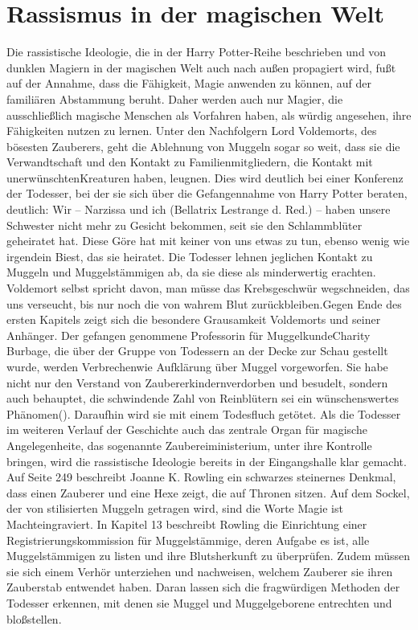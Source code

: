\section{Rassismus in der magischen Welt}
Die rassistische Ideologie, die in der \glqq Harry Potter\grqq-Reihe beschrieben und von dunklen Magiern in der magischen Welt auch nach außen propagiert wird, fußt auf der Annahme, dass die Fähigkeit, Magie anwenden zu können, auf der familiären Abstammung beruht. Daher werden auch nur Magier, die ausschließlich magische Menschen als Vorfahren haben, als würdig angesehen, ihre Fähigkeiten nutzen zu lernen. Unter den Nachfolgern Lord Voldemorts, des bösesten Zauberers, geht die Ablehnung von Muggeln sogar so weit, dass sie die Verwandtschaft und den Kontakt zu Familienmitgliedern, die Kontakt mit \glqq unerwünschten\grqq Kreaturen haben, leugnen. Dies wird deutlich bei einer Konferenz der Todesser, bei der sie sich über die Gefangennahme von Harry Potter beraten, deutlich: \glqq Wir – Narzissa und ich (Bellatrix Lestrange d. Red.) – haben unsere Schwester nicht mehr zu Gesicht bekommen, seit sie den Schlammblüter geheiratet hat. Diese Göre hat mit keiner von uns etwas zu tun, ebenso wenig wie irgendein Biest, das sie heiratet.\cite[S.18]{JKR10}\grqq
Die Todesser lehnen jeglichen Kontakt zu Muggeln und Muggelstämmigen ab, da sie diese als minderwertig erachten. Voldemort selbst spricht davon, man müsse \glqq das Krebsgeschwür wegschneiden, das uns verseucht, bis nur noch die von wahrem Blut zurückbleiben.\cite[S.19]{JKR10}\grqq Gegen Ende des ersten Kapitels zeigt sich die besondere Grausamkeit Voldemorts und seiner Anhänger. Der gefangen genommene Professorin für \glqq Muggelkunde\grqq Charity Burbage, die über der Gruppe von Todessern an der Decke zur Schau gestellt wurde, werden \glqq Verbrechen\grqq wie Aufklärung über Muggel vorgeworfen. Sie habe nicht nur \glqq den Verstand von Zaubererkindern\grqq verdorben und besudelt, sondern auch behauptet, die schwindende Zahl von Reinblütern sei ein \glqq wünschenswertes Phänomen\grqq (\cite[S.19]{JKR10}). Daraufhin wird sie mit einem Todesfluch getötet.
Als die Todesser im weiteren Verlauf der Geschichte auch das zentrale Organ für magische Angelegenheite, das sogenannte Zaubereiministerium, unter ihre Kontrolle bringen, wird die rassistische Ideologie bereits in der Eingangshalle klar gemacht. Auf Seite 249 beschreibt Joanne K. Rowling ein schwarzes steinernes Denkmal, dass einen Zauberer und eine Hexe zeigt, die auf Thronen sitzen.\cite[S.249]{JKR10} Auf dem Sockel, der von stilisierten Muggeln getragen wird, sind die Worte \glqq Magie ist Macht\grqq eingraviert. In Kapitel 13 beschreibt Rowling die Einrichtung einer \glqq Registrierungskommission für Muggelstämmige\grqq , deren Aufgabe es ist, alle Muggelstämmigen zu listen und ihre Blutsherkunft zu überprüfen. Zudem müssen sie sich einem Verhör unterziehen und nachweisen, welchem Zauberer sie ihren Zauberstab entwendet haben\cite [S.268]{JKR10}. Daran lassen sich die fragwürdigen Methoden der Todesser erkennen, mit denen sie Muggel und Muggelgeborene entrechten und bloßstellen. 
